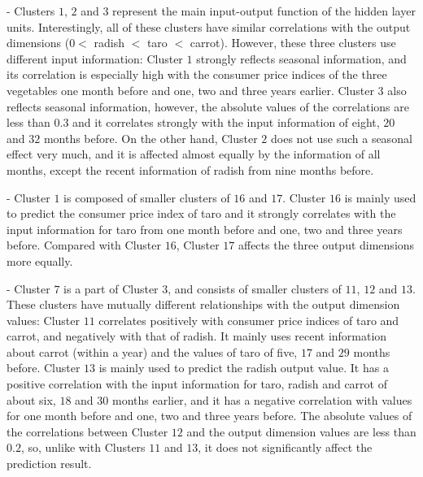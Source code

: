 \documentclass{article}
\begin{document}
- Clusters $1$, $2$ and $3$ represent the main input-output function of the hidden layer units. Interestingly, all of these clusters have similar correlations with the output dimensions ($0<$ radish $<$ taro $<$ carrot). However, these three clusters use different input information: Cluster $1$ strongly reflects seasonal information, and its correlation is especially high with the consumer price indices of the three vegetables one month before and one, two and three years earlier. 
Cluster $3$ also reflects seasonal information, however, the absolute values of the correlations are less than $0.3$ and it correlates strongly with the input information of eight, $20$ and $32$ months before. 
On the other hand, Cluster $2$ does not use such a seasonal effect very much, and it is affected almost equally by the information of all months, except the recent information of radish from nine months before. 

- Cluster $1$ is composed of smaller clusters of $16$ and $17$. Cluster $16$ is mainly used to predict the consumer price index of taro and it strongly correlates with the input information for taro from one month before and one, two and three years before. Compared with Cluster $16$, Cluster $17$ affects the three output dimensions more equally. 

- Cluster $7$ is a part of Cluster $3$, and consists of smaller clusters of $11$, $12$ and $13$. These clusters have mutually different relationships with the output dimension values: Cluster $11$ correlates positively with consumer price indices of taro and carrot, and negatively with that of radish. It mainly uses recent information about carrot (within a year) and the values of taro of five, $17$ and $29$ months before. Cluster $13$ is mainly used to predict the radish output value. It has a positive correlation with the input information for taro, radish and carrot of about six, $18$ and $30$ months earlier, and it has a negative correlation with values for one month before and one, two and three years before. The absolute values of the correlations between Cluster $12$ and the output dimension values are less than $0.2$, so, unlike with Clusters $11$ and $13$, it does not significantly affect the prediction result. 
\end{document}
